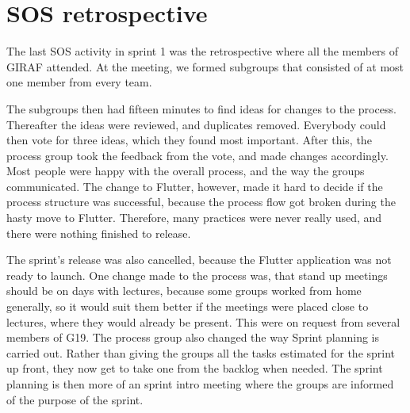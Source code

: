 \section{SOS retrospective}
The last \gls{SOS} activity in sprint 1 was the retrospective where all the members of GIRAF attended. At the meeting, we formed subgroups that consisted of at most one member from every team. 

The subgroups then had fifteen minutes to find ideas for changes to the process. Thereafter the ideas were reviewed, and duplicates removed. Everybody could then vote for three ideas, which they found most important. 
After this, the process group took the feedback from the vote, and made changes accordingly. Most people were happy with the overall process, and the way the groups communicated. 
The change to Flutter, however, made it hard to decide if the process structure was successful, because the process flow got broken during the hasty move to Flutter. Therefore, many practices were never really used, and there were nothing finished to release.

The sprint's release was also cancelled, because the Flutter application was not ready to launch. One change made to the process was, that stand up meetings should be on days with lectures, because some groups worked from home generally, so it would suit them better if the meetings were placed close to lectures, where they would already be present.
This were on request from several members of G19. The process group also changed the way Sprint planning is carried out.
Rather than giving the groups all the tasks estimated for the sprint up front, they now get to take one from the backlog when needed. 
The sprint planning is then more of an sprint intro meeting where the groups are informed of the purpose of the sprint. 
